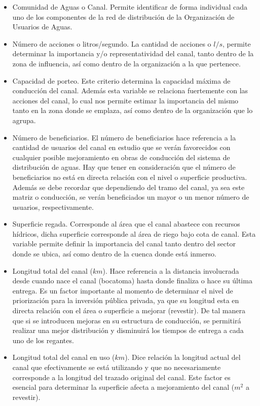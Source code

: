 \documentclass[]{article}
\begin{document}
\begin{itemize}
\item Comunidad de Aguas o Canal. Permite identificar de forma individual cada uno de los componentes de la red de distribución de la Organización de Usuarios de Aguas.
\item Número de acciones o litros/segundo. La cantidad de acciones o $l/s$, permite determinar la importancia y/o representatividad del canal, tanto dentro de la zona de influencia, así como dentro de la organización a la que pertenece.
\item Capacidad de porteo. Este criterio determina la capacidad máxima de conducción del canal. Además esta variable se relaciona fuertemente con las acciones del canal, lo cual nos permite estimar la importancia del mismo tanto en la zona donde se emplaza, así como dentro de la organización que lo agrupa.
\item Número de beneficiarios. El número de beneficiarios hace referencia a la cantidad de usuarios del canal en estudio que se verán favorecidos con cualquier posible mejoramiento en obras de conducción del sistema de distribución de aguas. Hay que tener en consideración que el número de beneficiarios no está en directa relación con el nivel o superficie productiva. Además se debe recordar que dependiendo del tramo del canal, ya sea este matriz o conducción, se verán beneficiados un mayor o un menor número de usuarios, respectivamente.
\item Superficie regada. Corresponde al área que el canal abastece con recursos hídricos, dicha superficie corresponde al área de riego bajo cota de canal. Esta variable permite definir la importancia del canal tanto dentro del sector donde se ubica, así como dentro de la cuenca donde está inmerso.
\item Longitud total del canal ($km$). Hace referencia a la distancia involucrada desde cuando nace el canal (bocatoma) hasta donde finaliza o hace su última entrega. Es un factor importante al momento de determinar el nivel de priorización para la inversión pública privada, ya que su longitud esta en directa relación con el área o superficie a mejorar (revestir). De tal manera que si se introducen mejoras en su estructura de conducción, se permitirá realizar una mejor distribución y disminuirá los tiempos de entrega a cada uno de los regantes.
\item Longitud total del canal en uso ($km$). Dice relación la longitud actual del canal que efectivamente se está utilizando y que no necesariamente corresponde a la longitud del trazado original del canal. Este factor es esencial para determinar la superficie afecta a mejoramiento del canal ($m^2$ a revestir).

\end{itemize}
\end{document}
